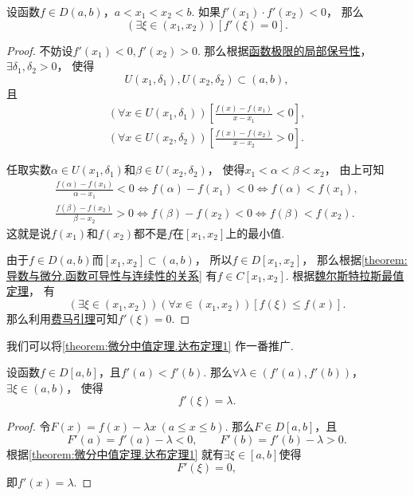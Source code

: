 \begin{theorem}[达布零点定理]\label{theorem:微分中值定理.达布定理1}
设函数\(f \in D(a,b)\)，\(a<x_1<x_2<b\).
如果\(f'(x_1) \cdot f'(x_2) < 0\)，
那么\[
	(\exists\xi\in(x_1,x_2))
	[f'(\xi) = 0].
\]
\begin{proof}
不妨设\(f'(x_1)<0,f'(x_2)>0\).
那么根据\hyperref[theorem:极限.函数极限的局部保号性1]{函数极限的局部保号性}，
\(\exists\delta_1,\delta_2>0\)，
使得\[
	U(x_1,\delta_1),U(x_2,\delta_2)\subset(a,b),
\]
且\[
	\begin{split}
		(\forall x \in U(x_1,\delta_1))
		\left[\frac{f(x)-f(x_1)}{x-x_1}<0\right], \\
		(\forall x \in U(x_2,\delta_2))
		\left[\frac{f(x)-f(x_2)}{x-x_2}>0\right].
	\end{split}
\]

任取实数\(\alpha \in U(x_1,\delta_1)\)和\(\beta \in U(x_2,\delta_2)\)，
使得\(x_1<\alpha<\beta<x_2\)，
由上可知\[
	\begin{split}
		\frac{f(\alpha)-f(x_1)}{\alpha-x_1}<0
		\iff
		f(\alpha)-f(x_1)<0
		\iff
		f(\alpha)<f(x_1), \\
		\frac{f(\beta)-f(x_2)}{\beta-x_2}>0
		\iff
		f(\beta)-f(x_2)<0
		\iff
		f(\beta)<f(x_2).
	\end{split}
\]
这就是说\(f(x_1)\)和\(f(x_2)\)都不是\(f\)在\([x_1,x_2]\)上的最小值.

由于\(f \in D(a,b)\)而\([x_1,x_2]\subset(a,b)\)，
所以\(f \in D[x_1,x_2]\)，
那么根据\cref{theorem:导数与微分.函数可导性与连续性的关系}
有\(f \in C[x_1,x_2]\).
根据\hyperref[theorem:极限.最值定理]{魏尔斯特拉斯最值定理}，
有\[
	(\exists\xi\in(x_1,x_2))
	(\forall x\in(x_1,x_2))
	[f(\xi) \leq f(x)].
\]
那么利用\hyperref[theorem:微分中值定理.费马引理]{费马引理}可知\(f'(\xi)=0\).
\end{proof}
\end{theorem}

我们可以将\cref{theorem:微分中值定理.达布定理1} 作一番推广.
\begin{theorem}[达布介值定理]\label{theorem:微分中值定理.达布定理2}
设函数\(f \in D[a,b]\)，且\(f'(a) < f'(b)\).
那么\(\forall\lambda\in(f'(a),f'(b))\)，\(\exists\xi\in(a,b)\)，
使得\[
	f'(\xi) = \lambda.
\]
\begin{proof}
令\(F(x) = f(x) - \lambda x\ (a \leq x \leq b)\).
那么\(F \in D[a,b]\)，且\[
	F'(a) = f'(a) - \lambda < 0, \qquad
	F'(b) = f'(b) - \lambda > 0.
\]
根据\cref{theorem:微分中值定理.达布定理1} 就有\(\exists\xi\in[a,b]\)使得\[
	F'(\xi)=0,
\]
即\(f'(x) = \lambda\).
\end{proof}
\end{theorem}

